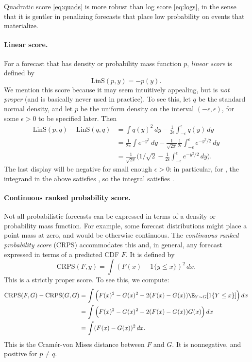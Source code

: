 \documentclass{article}
\begin{document}
Quadratic score \eqref{eq:quads} is more robust than log score \eqref{eq:logs},
in the sense that it is gentler in penalizing forecasts that place low
probability on events that materialize.  

\paragraph{Linear score.}

For a forecast that has density or probability mass function $p$,
\emph{linear score} is defined by   
\[
\mathrm{LinS}(p, y) = -p(y).
\]
We mention this score because it may seem intuitively appealing, but is
\emph{not proper} (and is basically never used in practice). To see this, let
$q$ be the standard normal density, and let $p$ be the uniform density on the 
interval $(-\epsilon, \epsilon)$, for some $\epsilon>0$ to be specified
later. Then    
\begin{align*}
\mathrm{LinS}(p, q) - \mathrm{LinS}(q, q) 
&= \int q(y)^2 \, dy - \frac{1}{2\epsilon} 
  \int_{-\epsilon}^\epsilon q(y) \, dy \\
&= \frac{1}{2\pi} \int e^{-y^2} \, dy -  \frac{1}{\sqrt{2\pi}}
  \frac{1}{2\epsilon} \int_{-\epsilon}^\epsilon e^{-y^2/2} \, dy \\   
&= \frac{1}{\sqrt{2\pi}} \bigg( 1/\sqrt{2} - \frac{1}{2\epsilon}
\int_{-\epsilon}^\epsilon e^{-y^2/2} \, dy \bigg).
\end{align*}
The last display will be negative for small enough $\epsilon > 0$: in 
particular, for , the integrand in the above
satisfies , so the integral satisfies
.

\paragraph{Continuous ranked probability score.}

Not all probabilistic forecasts can be expressed in terms of a density or
probability mass function. For example, some forecast distributions might place
a point mass at zero, and would be otherwise continuous. The \emph{continuous
  ranked probability score} (CRPS) accommodates this and, in general, any
forecast expressed in terms of a predicted CDF $F$. It is defined by 
\begin{equation}
\label{eq:crps}
\mathrm{CRPS}(F, y) = \int (F(x) - 1\{y \leq x\})^2 \, dx. 
\end{equation}
This is a strictly proper score. To see this, we compute: 
\begin{align*}
\mathrm{CRPS}(F, G) - \mathrm{CRPS}(G ,G) 
&= \int \Big( F(x)^2 - G(x)^2 - 2(F(x) - G(x)) \E_{Y \sim G}[ 1\{Y \leq x\} ]
  \Big) \, dx \\
&= \int \Big( F(x)^2 - G(x)^2 - 2(F(x) - G(x)) G(x) \Big) \, dx \\
&= \int (F(x) - G(x))^2 \, dx.
\end{align*}
This is the Cram{\'e}r-von Mises distance between $F$ and $G$. It is
nonnegative, and positive for $p \not= q$.   
\end{document}
